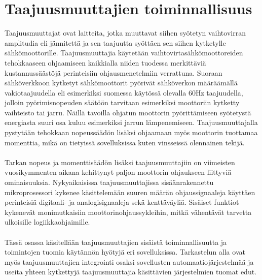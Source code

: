 \documentclass[finnish,12pt,a4paper,pdftex,elec,utf8]{aaltothesis}
\begin{document}
\section{Taajuusmuuttajien toiminnallisuus}
Taajuusmuuttajat ovat laitteita, jotka muuttavat siihen syötetyn vaihtovirran amplitudia eli jännitettä ja sen taajuutta syöttäen sen siihen kytketylle sähkömoottorille. Taajuusmuuttajia käytetään vaihtovirtasähkömoottoreiden tehokkaaseen ohjaamiseen kaikkialla niiden tuodessa merkittäviä kustannussäästöjä perinteisiin ohjausmenetelmiin verrattuna. Suoraan sähköverkkoon kytketyt sähkömoottorit pyörivät sähköverkon määräämällä vakiotaajuudella eli esimerkiksi suomessa käytössä olevalla 60Hz taajuudella, jolloin pyörimisnopeuden säätöön tarvitaan esimerkiksi moottoriin kytketty vaihteisto tai jarru. Näillä tavoilla ohjatun moottorin pyörittämiseen syötetystä energiasta suuri osa kuluu esimerkiksi jarrun lämpenemiseen. Taajuusmuuttajalla pystytään tehokkaan nopeussäädön lisäksi ohjaamaan myös moottorin tuottamaa momenttia, mikä on tietyissä sovelluksissa kuten vinsseissä olennainen tekijä.
\\\\
Tarkan nopeus ja momenttisäädön lisäksi taajuusmuuttajiin on viimeisten vuosikymmenten aikana kehittynyt paljon moottorin ohjaukseen liittyviä ominaisuuksia. Nykyaikaisissa taajuusmuuttajissa sisäänrakennettu mikroprosessori kykenee käsittelemään suuren määrän ohjaussignaaleja käyttäen perinteisiä digitaali- ja analogisignaaleja sekä kenttäväyliä. Sisäiset funktiot kykenevät monimutkaisiin moottorinohjaussykleihin, mitkä vähentävät tarvetta ulkoisille logiikkaohjaimille.
\\\\
Tässä osassa käsitellään taajuusmuuttajien sisäistä toiminnallisuutta ja toimintojen tuomia käytännön hyötyjä eri sovelluksissa. Tarkastelun alla ovat myös taajuusmuuttajien integrointi osaksi sovellusten automaatiojärjestelmää ja useita yhteen kytkettyjä taajuusmuuttajia käsittävien järjestelmien tuomat edut.

\end{document}
